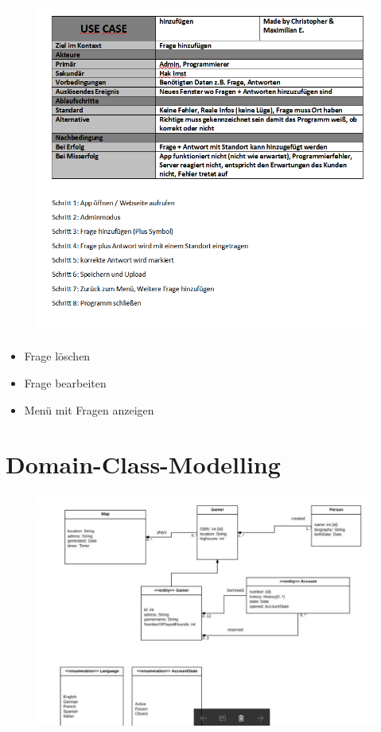 \begin{figure}
	\centering
	\includegraphics[width=1.2\linewidth]{screenshot011}
	\caption{}
	\label{fig:screenshot011}
\end{figure}


\begin{itemize}
	\item Frage löschen
	\item Frage bearbeiten
	\item Menü mit Fragen anzeigen
\end{itemize}




\section{Domain-Class-Modelling}

\begin{figure}
	\centering
	\includegraphics[width=1.1\linewidth]{screenshot008}
	\caption{}
	\label{fig:screenshot008}
\end{figure}


